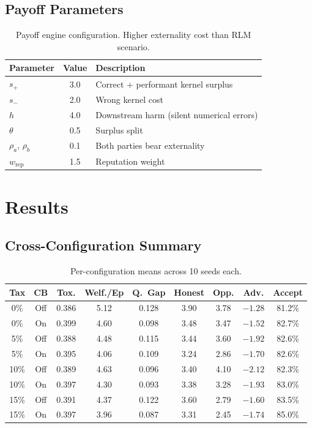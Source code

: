 \documentclass[11pt]{article}
\begin{document}
\subsection{Payoff Parameters}

\begin{table}[H]
\centering
\caption{Payoff engine configuration. Higher externality cost than RLM scenario.}
\small
\begin{tabular}{@{}lcl@{}}
\toprule
Parameter & Value & Description \\
\midrule
$s_+$ & 3.0 & Correct + performant kernel surplus \\
$s_-$ & 2.0 & Wrong kernel cost \\
$h$ & 4.0 & Downstream harm (silent numerical errors) \\
$\theta$ & 0.5 & Surplus split \\
$\rho_a$, $\rho_b$ & 0.1 & Both parties bear externality \\
$w_{\text{rep}}$ & 1.5 & Reputation weight \\
\bottomrule
\end{tabular}
\end{table}

\section{Results}

\subsection{Cross-Configuration Summary}

\begin{table}[H]
\centering
\caption{Per-configuration means across 10 seeds each.}
\small
\begin{tabular}{@{}ccccccccc@{}}
\toprule
Tax & CB & Tox. & Welf./Ep & Q.\ Gap & Honest & Opp. & Adv. & Accept \\
\midrule
0\% & Off & 0.386 & 5.12 & 0.128 & 3.90 & 3.78 & $-1.28$ & 81.2\% \\
0\% & On & 0.399 & 4.60 & 0.098 & 3.48 & 3.47 & $-1.52$ & 82.7\% \\
5\% & Off & 0.388 & 4.48 & 0.115 & 3.44 & 3.60 & $-1.92$ & 82.6\% \\
5\% & On & 0.395 & 4.06 & 0.109 & 3.24 & 2.86 & $-1.70$ & 82.6\% \\
10\% & Off & 0.389 & 4.63 & 0.096 & 3.40 & 4.10 & $-2.12$ & 82.3\% \\
10\% & On & 0.397 & 4.30 & 0.093 & 3.38 & 3.28 & $-1.93$ & 83.0\% \\
15\% & Off & 0.391 & 4.37 & 0.122 & 3.60 & 2.79 & $-1.60$ & 83.5\% \\
15\% & On & 0.397 & 3.96 & 0.087 & 3.31 & 2.45 & $-1.74$ & 85.0\% \\
\bottomrule
\end{tabular}
\end{table}
\end{document}
